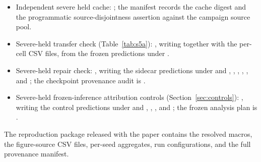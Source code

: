 \documentclass[letterpaper,onecolumn,11pt,journal]{IEEEtran}
\begin{document}
\begin{itemize}
  manifest; it is never an input feature of any model.
  \item Independent severe held cache:
  ; the manifest records the cache
  digest and the programmatic source-disjointness assertion against the
  campaign source pool.
  \item Severe-held transfer check (Table~\ref{tab:s5a}):
  , writing
   together with
  the per-cell CSV files, from the frozen predictions under
  .
  \item Severe-held repair check:
  , writing the
  sidecar predictions under
   and
  , ,
  , ,
  , and ; the
  checkpoint provenance audit is .
  \item Severe-held frozen-inference attribution controls
  (Section~\ref{sec:controls}):
  , writing the
  control predictions under  and
  , ,
  , and
  ; the frozen analysis plan is
  .
\end{itemize}

The reproduction package released with the paper contains the resolved macros,
the figure-source CSV files, per-seed aggregates, run configurations, and the
full provenance manifest.
\end{document}
